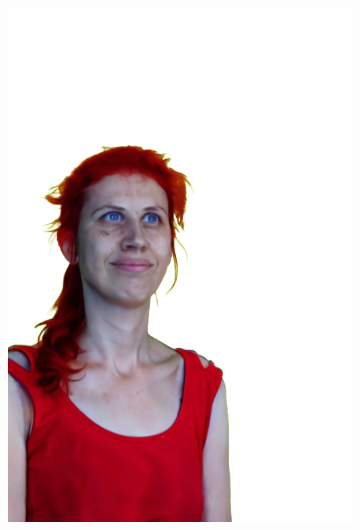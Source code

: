 \begin{figure}[ht]
\begin{subfigure}{0.08\linewidth}
        \includegraphics[width=\textwidth]{Figures/results/low/dora_red/11_render.png}

\end{subfigure}
\end{figure}

